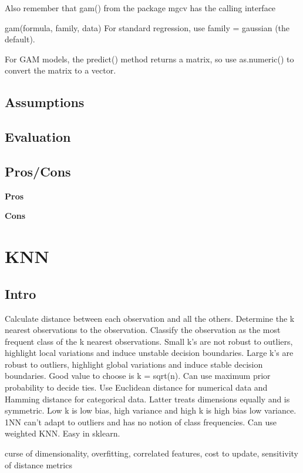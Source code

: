 \documentclass[]{book}
\theoremstyle{definition}
\theoremstyle{definition}
\theoremstyle{definition}
\theoremstyle{remark}
\begin{document}
Also remember that gam() from the package mgcv has the calling interface

gam(formula, family, data) For standard regression, use family =
gaussian (the default).

For GAM models, the predict() method returns a matrix, so use
as.numeric() to convert the matrix to a vector.

\subsection{Assumptions}\label{assumptions-10}

\subsection{Evaluation}\label{evaluation-10}

\subsection{Pros/Cons}\label{proscons-10}

\textbf{Pros}

\textbf{Cons}

\section{KNN}\label{knn}

\subsection{Intro}\label{intro-11}

Calculate distance between each observation and all the others.
Determine the k nearest observations to the observation. Classify the
observation as the most frequent class of the k nearest observations.
Small k's are not robust to outliers, highlight local variations and
induce unstable decision boundaries. Large k's are robust to outliers,
highlight global variations and induce stable decision boundaries. Good
value to choose is k = sqrt(n). Can use maximum prior probability to
decide ties. Use Euclidean distance for numerical data and Hamming
distance for categorical data. Latter treats dimensions equally and is
symmetric. Low k is low bias, high variance and high k is high bias low
variance. 1NN can't adapt to outliers and has no notion of class
frequencies. Can use weighted KNN. Easy in sklearn.

curse of dimensionality, overfitting, correlated features, cost to
update, sensitivity of distance metrics
\end{document}
